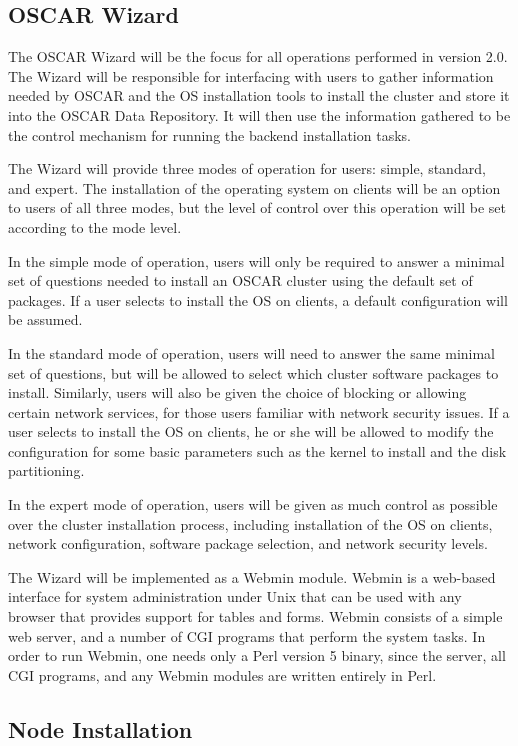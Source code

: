 \subsection{OSCAR Wizard}

The OSCAR Wizard will be the focus for all operations performed in
version 2.0. The Wizard will be responsible for interfacing with users
to gather information needed by OSCAR and the OS installation tools to
install the cluster and store it into the OSCAR Data Repository. It
will then use the information gathered to be the control mechanism for
running the backend installation tasks.

The Wizard will provide three modes of operation for users: simple,
standard, and expert. The installation of the operating system on
clients will be an option to users of all three modes, but the level
of control over this operation will be set according to the mode
level.

In the simple mode of operation, users will only be required to answer
a minimal set of questions needed to install an OSCAR cluster using
the default set of packages. If a user selects to install the OS on
clients, a default configuration will be assumed.

In the standard mode of operation, users will need to answer the same
minimal set of questions, but will be allowed to select which cluster
software packages to install. Similarly, users will also be given the
choice of blocking or allowing certain network services, for those
users familiar with network security issues.  If a user selects to
install the OS on clients, he or she will be allowed to modify the
configuration for some basic parameters such as the kernel to install
and the disk partitioning.

In the expert mode of operation, users will be given as much control
as possible over the cluster installation process, including
installation of the OS on clients, network configuration, software
package selection, and network security levels.

The Wizard will be implemented as a Webmin module. Webmin is a
web-based interface for system administration under Unix that can be
used with any browser that provides support for tables and
forms. Webmin consists of a simple web server, and a number of CGI
programs that perform the system tasks. In order to run Webmin, one
needs only a Perl version 5 binary, since the server, all CGI
programs, and any Webmin modules are written entirely in Perl.

\subsection{Node Installation}

